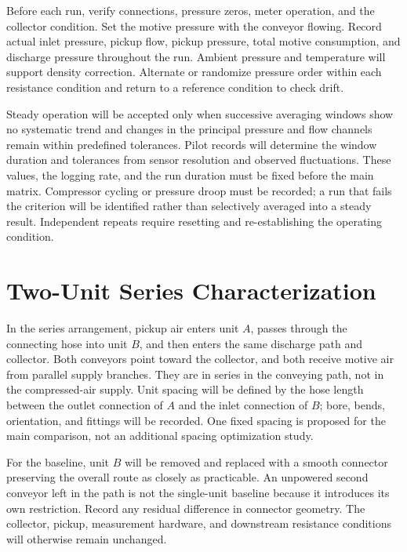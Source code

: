 Before each run, verify connections, pressure zeros, meter operation, and the collector condition. Set the motive pressure with the conveyor flowing. Record actual inlet pressure, pickup flow, pickup pressure, total motive consumption, and discharge pressure throughout the run. Ambient pressure and temperature will support density correction. Alternate or randomize pressure order within each resistance condition and return to a reference condition to check drift.

Steady operation will be accepted only when successive averaging windows show no systematic trend and changes in the principal pressure and flow channels remain within predefined tolerances. Pilot records will determine the window duration and tolerances from sensor resolution and observed fluctuations. These values, the logging rate, and the run duration must be fixed before the main matrix. Compressor cycling or pressure droop must be recorded; a run that fails the criterion will be identified rather than selectively averaged into a steady result. Independent repeats require resetting and re-establishing the operating condition.


\section{Two-Unit Series Characterization}
\label{sec:series-characterization}
In the series arrangement, pickup air enters unit $A$, passes through the connecting hose into unit $B$, and then enters the same discharge path and collector. Both conveyors point toward the collector, and both receive motive air from parallel supply branches. They are in series in the conveying path, not in the compressed-air supply. Unit spacing will be defined by the hose length between the outlet connection of $A$ and the inlet connection of $B$; bore, bends, orientation, and fittings will be recorded. One fixed spacing is proposed for the main comparison, not an additional spacing optimization study.

For the baseline, unit $B$ will be removed and replaced with a smooth connector preserving the overall route as closely as practicable. An unpowered second conveyor left in the path is not the single-unit baseline because it introduces its own restriction. Record any residual difference in connector geometry. The collector, pickup, measurement hardware, and downstream resistance conditions will otherwise remain unchanged.


